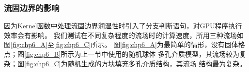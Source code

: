\subsubsection{流固边界的影响}
因为Kernel函数中处理流固边界润湿性时引入了分支判断语句，对GPU程序执行效率会有影响。
我们测试在不同复杂程度的流场时的计算速度，所用三种流场如图\ref{fig:chp6_A}至\ref{fig:chp6_C}所示。
图\ref{fig:chp6_A}为最简单的情形，没有固体格点；图\ref{fig:chp6_B}所示为上一节中使用的随机球体
多孔介质模型，其流场较为复杂；图\ref{fig:chp6_C}为随机生成的方块填充多孔介质结构，其流场
结构最为复杂。
\begin{figure}[htpb]
  \centering
\end{figure}
